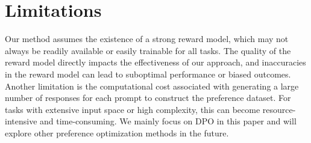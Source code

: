 \section*{Limitations}

Our method assumes the existence of a strong reward model, which may not always be readily available or easily trainable for all tasks. 
The quality of the reward model directly impacts the effectiveness of our approach, and inaccuracies in the reward model can lead to suboptimal performance or biased outcomes.
Another limitation is the computational cost associated with generating a large number of responses for each prompt to construct the preference dataset. 
For tasks with extensive input space or high complexity, this can become resource-intensive and time-consuming.
We mainly focus on DPO in this paper and will explore other preference optimization methods in the future.
